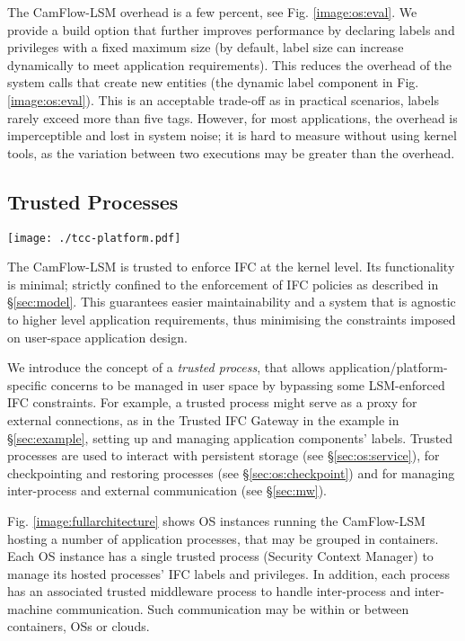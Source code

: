 \documentclass[10pt,journal,compsoc]{IEEEtran}
\begin{document}
The CamFlow-LSM overhead is a few percent, see Fig. \ref{image:os:eval}.
We provide a build option that further improves performance by declaring labels and privileges with a fixed maximum size (by default, label size can increase dynamically to meet application requirements). This reduces the overhead of the system calls that create new entities (the dynamic label component in Fig. \ref{image:os:eval}). 
This is an acceptable trade-off as in practical scenarios, labels rarely exceed more than five tags.
However, for most applications, the overhead is imperceptible and lost in system noise; it is hard to measure without using kernel tools, as the variation between two executions may be greater than the overhead.



\subsection{Trusted Processes}
\label{sec:os:trusted}

\begin{figure*}[t]
\centering
  \texttt{[image: ./tcc-platform.pdf]}
  \caption{CamFlow Architecture: Labelled OS objects, trusted processes and communication middleware. 
    }
  \label{image:fullarchitecture}
\end{figure*}


The CamFlow-LSM is trusted to enforce IFC at the kernel level. Its functionality is minimal; strictly confined to the enforcement of IFC policies as described in \S\ref{sec:model}.
This guarantees easier maintainability and a system that is agnostic to higher level application requirements, thus minimising the constraints imposed on user-space application design.

We introduce the concept of a {\em trusted process}, that allows application/platform-specific concerns to be managed in user space by bypassing some LSM-enforced IFC constraints. For example, a trusted process might serve as a proxy for external connections, as in the Trusted IFC Gateway in the example in \S\ref{sec:example}, setting up and managing application components' labels. Trusted processes are used to interact with persistent storage (see \S\ref{sec:os:service}), for checkpointing and restoring processes (see \S\ref{sec:os:checkpoint}) and for managing inter-process and external communication (see \S\ref{sec:mw}).

Fig. \ref{image:fullarchitecture} shows OS instances running the CamFlow-LSM hosting a number of application processes, that may be grouped in containers. Each OS instance has a single trusted process (Security Context Manager) to manage its hosted processes' IFC labels and privileges. In addition, each process has an associated trusted middleware process to handle inter-process and inter-machine communication. Such communication may be within or between containers, OSs or clouds. 
\end{document}
